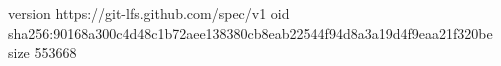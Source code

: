 version https://git-lfs.github.com/spec/v1
oid sha256:90168a300c4d48c1b72aee138380cb8eab22544f94d8a3a19d4f9eaa21f320be
size 553668
